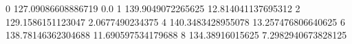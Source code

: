 0 127.09086608886719 0.0
1 139.9049072265625 12.814041137695312
2 129.1586151123047 2.0677490234375
4 140.3483428955078 13.257476806640625
6 138.78146362304688 11.690597534179688
8 134.38916015625 7.2982940673828125
